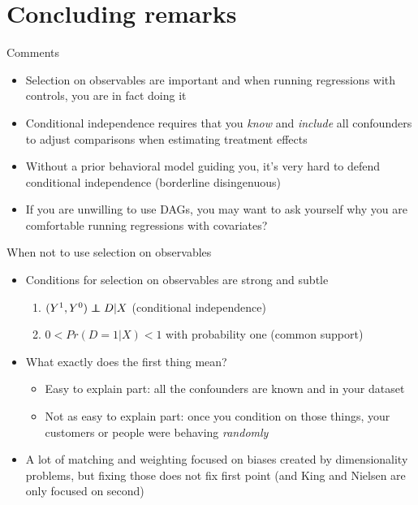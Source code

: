 \documentclass{beamer}
\newcommand\independent{\protect\mathpalette{\protect\independenT}{\perp}}
\def\independenT#1#2{\mathrel{\rlap{$#1#2$}\mkern2mu{#1#2}}}
\begin{document}
\section{Concluding remarks}

\begin{frame}{Comments}

\begin{itemize}

\item Selection on observables are important and when running regressions with controls, you are in fact doing it
\item Conditional independence requires that you \emph{know} and \emph{include} all confounders to adjust comparisons when estimating treatment effects
\item Without a prior behavioral model guiding you, it's very hard to defend conditional independence (borderline disingenuous) 
\item If you are unwilling to use DAGs, you may want to ask yourself why you are comfortable running regressions with covariates?

\end{itemize}

\end{frame}

\begin{frame}{When not to use selection on observables}

\begin{itemize}
\item Conditions for selection on observables are strong and subtle
\begin{enumerate}
		\item $(Y^1,Y^0) \independent{D} | X$ (conditional independence)
		\item $0<Pr(D=1|X)<1$ with probability one (common support)
\end{enumerate}
\item What exactly does the first thing mean?
		\begin{itemize}
		\item Easy to explain part: all the confounders are known and in your dataset
		\item Not as easy to explain part: once you condition on those things, your customers or people were behaving \emph{randomly}
		\end{itemize}
\item A lot of matching and weighting focused on biases created by dimensionality problems, but fixing those does not fix first point (and King and Nielsen are only focused on second)
\end{itemize}

\end{frame}  
\end{document}

